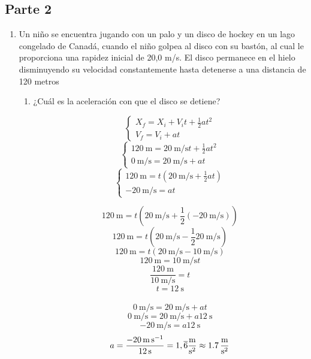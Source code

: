 \documentclass[Física - Práctica.root.tex]{subfiles}
\begin{document}
\subsection{Parte 2}
\begin{enumerate}
  \item Un niño se encuentra jugando con un palo y un disco de hockey en un lago congelado de
        Canadá, cuando el niño golpea al disco con su bastón, al cual le proporciona una rapidez
        inicial de 20,0 m/s. El disco permanece en el hielo disminuyendo su velocidad
        constantemente hasta detenerse a una distancia de 120 metros
        \begin{enumerate}
          \item ¿Cuál es la aceleración con que el disco se detiene?

                \[
                  \begin{cases}
                    X_f = X_i + V_it + \frac{1}{2}at^2
                    \\
                    V_f = V_i + at
                  \end{cases}
                \]\[
                  \begin{cases}
                    \SI{120}{\meter} = \SI{20}{\meter\per\second}t + \frac{1}{2}at^2
                    \\
                    \SI{0}{\meter\per\second} = \SI{20}{\meter\per\second} + at
                  \end{cases}
                \]\[
                  \begin{cases}
                    \SI{120}{\meter} = t(\SI{20}{\meter\per\second} + \frac{1}{2}at)
                    \\
                    -\SI{20}{\meter\per\second} = at
                  \end{cases}
                \]

                \[ \SI{120}{\meter} = t(\SI{20}{\meter\per\second} + \frac{1}{2}(-\SI{20}{\meter\per\second})) \]
                \[ \SI{120}{\meter} = t(\SI{20}{\meter\per\second} - \frac{1}{2}\SI{20}{\meter\per\second}) \]
                \[ \SI{120}{\meter} = t(\SI{20}{\meter\per\second} - \SI{10}{\meter\per\second}) \]
                \[ \SI{120}{\meter} = \SI{10}{\meter\per\second}t \]
                \[ \frac{\SI{120}{\meter}}{\SI{10}{\meter\per\second}} = t \]
                \[ t = \SI{12}{\second} \]
                \\
                \[ \SI{0}{\meter\per\second} = \SI{20}{\meter\per\second} + at \]
                \[ \SI{0}{\meter\per\second} = \SI{20}{\meter\per\second} + a\SI{12}{\second} \]
                \[ -\SI{20}{\meter\per\second} = a\SI{12}{\second} \]
                \[ a 
                    = \frac{-\SI{20}{\meter\per\second}}{\SI{12}{\second}} 
                    = 1,\overline{6}\si[per-mode=fraction]{\meter\per\second\squared}
                    \approx \SI[per-mode=fraction]{1,7}{\meter\per\second\squared}
                \]


\end{enumerate}
\end{enumerate}
\end{document}
